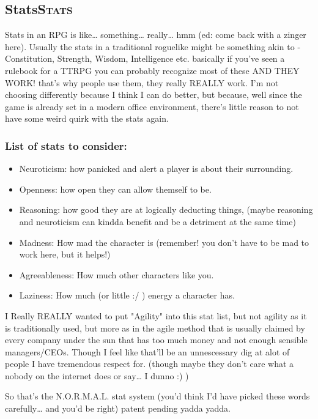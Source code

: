 \documentclass[11pt]{article}
\begin{document}
\subsection{Stats\hfill{}\textsc{Stats}}
\label{sec:org1df1ee9}

Stats in an RPG is like\ldots{} something\ldots{} really\ldots{} hmm (ed: come back with a zinger here). Usually the stats in a traditional roguelike might be something akin to - Constitution, Strength, Wisdom, Intelligence etc. basically if you've seen a rulebook for a TTRPG you can probably recognize most of these AND THEY WORK! that's why people use them, they really REALLY work. I'm not choosing differently because I think I can do better, but because, well since the game is already set in a modern office environment, there's little reason to not have some weird quirk with the stats again.

\subsubsection{List of stats to consider:}
\label{sec:orgf5d491d}
\begin{itemize}
\item Neuroticism: how panicked and alert a player is about their surrounding.
\item Openness: how open they can allow themself to be.
\item Reasoning: how good they are at logically deducting things, (maybe reasoning and neuroticism can kindda benefit and be a detriment at the same time)
\item Madness: How mad the character is (remember! you don't have to be mad to work here, but it helps!)
\item Agreeableness: How much other characters like you.
\item Laziness: How much (or little :/ ) energy a character has.
\end{itemize}


I Really REALLY wanted to put "Agility" into this stat list, but not agility as it is traditionally used, but more as in the agile method that is usually claimed by every company under the sun that has too much money and not enough sensible managers/CEOs. Though I feel like that'll be an unnescessary dig at alot of people I have tremendous respect for. (though maybe they don't care what a nobody on the internet does or say\ldots{} I dunno :) )

So that's the N.O.R.M.A.L. stat system (you'd think I'd have picked these words carefully\ldots{} and you'd be right) patent pending yadda yadda.
\end{document}

